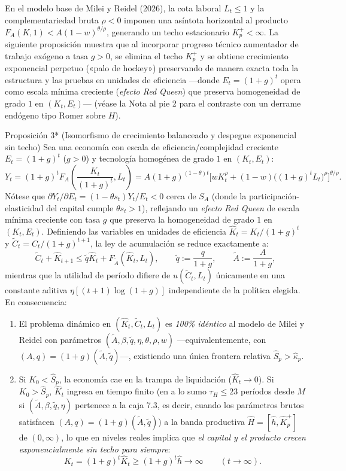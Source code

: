 \documentclass[11pt,letterpaper]{article}
\theoremstyle{plain}
\newtheorem*{namedthm}{\protect\namedthmname}
\newcommand{\namedthmname}{}
\newenvironment{thm_box}[1]{\renewcommand{\namedthmname}{#1}\begin{namedthm}}{\end{namedthm}}
\begin{document}
En el modelo base de Milei y Reidel (2026), la cota laboral $L_t\le 1$ y la complementariedad bruta $\rho<0$ imponen una asíntota horizontal al producto $F_A(K,1)<A(1-w)^{\theta/\rho}$, generando un techo estacionario $K_p^+<\infty$. La siguiente proposición muestra que al incorporar progreso técnico aumentador de trabajo exógeno a tasa $g>0$, se elimina el techo $K_p^+$ y se obtiene crecimiento exponencial perpetuo («palo de hockey») preservando de manera exacta toda la estructura y las pruebas en unidades de eficiencia ---donde $E_t=(1+g)^t$ opera como escala mínima creciente (\emph{efecto Red Queen}) que preserva homogeneidad de grado $1$ en $(K_t,E_t)$--- (véase la Nota al pie 2 para el contraste con un derrame endógeno tipo Romer sobre $H$).

\begin{thm_box}{Proposición 3* (Isomorfismo de crecimiento balanceado y despegue exponencial sin techo)}
Sea una economía con escala de eficiencia/complejidad creciente $E_t=(1+g)^t$ ($g>0$) y tecnología homogénea de grado $1$ en $(K_t, E_t)$:
\[
Y_t = (1+g)^t F_A\!\left(\frac{K_t}{(1+g)^t}, L_t\right) = A(1+g)^{(1-\theta)t}\big[wK_t^\rho + (1-w)\big((1+g)^t L_t\big)^\rho\big]^{\theta/\rho}.
\]
Nótese que $\partial Y_t/\partial E_t = (1-\theta s_t)Y_t/E_t < 0$ cerca de $S_A$ (donde la participación-elasticidad del capital cumple $\theta s_t>1$), reflejando un \emph{efecto Red Queen} de escala mínima creciente con tasa $g$ que preserva la homogeneidad de grado $1$ en $(K_t, E_t)$. Definiendo las variables en unidades de eficiencia $\hat{K}_t=K_t/(1+g)^t$ y $\tilde{C}_t=C_t/(1+g)^{t+1}$, la ley de acumulación se reduce exactamente a:
\[
\tilde{C}_t + \hat{K}_{t+1} \le \tilde{q}\hat{K}_t + F_{\tilde{A}}(\hat{K}_t,L_t), \qquad \tilde{q}:=\frac{q}{1+g}, \qquad \tilde{A}:=\frac{A}{1+g},
\]
mientras que la utilidad de período difiere de $u(\tilde{C}_t,L_t)$ únicamente en una constante aditiva $\eta[(t+1)\log(1+g)]$ independiente de la política elegida. En consecuencia:
\begin{enumerate}
\item El problema dinámico en $(\hat{K}_t,\tilde{C}_t,L_t)$ es \emph{100\% idéntico} al modelo de Milei y Reidel con parámetros $(\tilde{A},\beta,\tilde{q},\eta,\theta,\rho,w)$ ---equivalentemente, con $(A,q)=(1+g)(\tilde{A},\tilde{q})$---, existiendo una única frontera relativa $\hat{S}_p > \hat{\kappa}_p$.
\item Si $K_0<\hat{S}_p$, la economía cae en la trampa de liquidación ($\hat{K}_t\to 0$). Si $K_0>\hat{S}_p$, $\hat{K}_t$ ingresa en tiempo finito (en a lo sumo $\tau_H\le 23$ períodos desde $M$ si $(\tilde{A},\beta,\tilde{q},\eta)$ pertenece a la caja 7.3, es decir, cuando los parámetros brutos satisfacen $(A,q)=(1+g)(\tilde{A},\tilde{q})$) a la banda productiva $\hat{H}=[\hat{h},\hat{K}_p^+]$ de $(0,\infty)$, lo que en niveles reales implica que \emph{el capital y el producto crecen exponencialmente sin techo para siempre}:
\[
K_t = (1+g)^t\hat{K}_t \ge (1+g)^t\hat{h} \to \infty \qquad (t\to\infty).
\]
\end{enumerate}
\end{thm_box}
\end{document}
